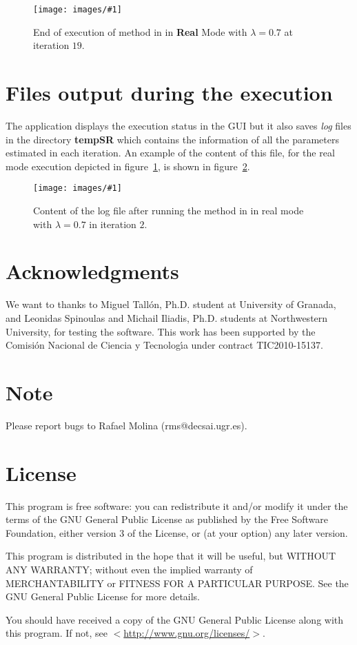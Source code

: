 \documentclass[11pt,a4paper]{article}
\newcommand{\figureimage}[4]{%
\begin{figure}[t]%
\begin{center}%
\texttt{[image: images/\#1]}%
\caption{#4}%
\label{#3}%
\end{center}%
\end{figure}%
} %
\begin{document}
\figureimage{r03}{width=0.75\textwidth}{fig:ap01r03}%
 {End of execution of method in \cite{Villena:11} in \textbf{Real} Mode with $\lambda=0.7$ at iteration $19$.}

\section{Files output during the execution}

The application displays the execution status in the GUI but it also saves \textit{log} files in the directory \textbf{tempSR} which contains the information of all the parameters estimated in each iteration. An example of the content of this file, for the real mode execution depicted in figure~\ref{fig:ap01r03}, is shown in figure~\ref{fig:ap01log01}.

\figureimage{log01}{width=0.75\textwidth}{fig:ap01log01}%
 {Content of the log file after running the method in \cite{Villena:11} in real mode with $\lambda=0.7$ in iteration $2$.}

\section*{Acknowledgments}

We want to thanks to Miguel Tall\'on, Ph.D. student at University of Granada, and Leonidas Spinoulas and Michail Iliadis, Ph.D. students at Northwestern University,  for testing the software. This work has been supported by the Comisi\'on Nacional de Ciencia y Tecnolog\'{\i}a under contract TIC2010-15137.

\section*{Note}

Please report bugs to Rafael Molina (rms@decsai.ugr.es).

\section*{License}

    This program is free software: you can redistribute it and/or modify
    it under the terms of the GNU General Public License as published by
    the Free Software Foundation, either version 3 of the License, or
    (at your option) any later version.

    This program is distributed in the hope that it will be useful,
    but WITHOUT ANY WARRANTY; without even the implied warranty of
    MERCHANTABILITY or FITNESS FOR A PARTICULAR PURPOSE.  See the
    GNU General Public License for more details.

    You should have received a copy of the GNU General Public License
    along with this program.  If not, see $<$\url{http://www.gnu.org/licenses/}$>$.



\end{document}
